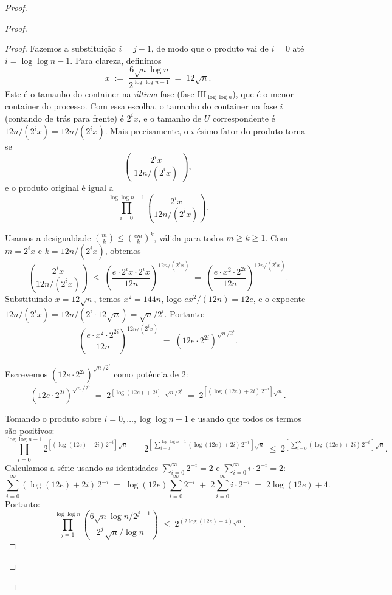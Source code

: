 \documentclass[reqno,a4paper,12pt]{amsart}
\begin{document}
\begin{proof}
\begin{proof}
    \begin{proof}
      Fazemos a substituição $i = j - 1$, de modo que o produto vai de $i = 0$ até
      $i = \log\log n - 1$. Para clareza, definimos
      \[
        x \;:=\; \frac{6\sqrt{n}\log n}{2^{\log\log n - 1}} \;=\; 12\sqrt{n}.
      \]
      Este é o tamanho do container na \emph{última} fase (fase $\mathrm{III}_{\log\log n}$), que é o
      menor container do processo. Com essa escolha, o tamanho do container na fase $i$ (contando de
      trás para frente) é $2^i x$, e o tamanho de $U$ correspondente é $12n / (2^i x) = 12n/(2^i x)$.
      Mais precisamente, o $i$-ésimo fator do produto torna-se
      \[
        \binom{2^i x}{\;12n/(2^i x)\;},
      \]
      e o produto original é igual a
      \[
        \prod_{i=0}^{\log\log n - 1} \binom{2^i x}{12n / (2^i x)}.
      \]

      Usamos a desigualdade $\binom{m}{k} \leq \left(\frac{em}{k}\right)^k$, válida para todos
      $m \geq k \geq 1$. Com $m = 2^i x$ e $k = 12n/(2^i x)$, obtemos
      \[
        \binom{2^i x}{12n/(2^i x)}
        \;\leq\;
        \left(\frac{e \cdot 2^i x \cdot 2^i x}{12n}\right)^{12n/(2^i x)}
        \;=\;
        \left(\frac{e \cdot x^2 \cdot 2^{2i}}{12n}\right)^{12n/(2^i x)}.
      \]
      Substituindo $x = 12\sqrt{n}$, temos $x^2 = 144n$, logo $ex^2/(12n) = 12e$, e o expoente
      $12n/(2^i x) = 12n / (2^i \cdot 12\sqrt{n}) = \sqrt{n}/2^i$. Portanto:
      \[
        \left(\frac{e \cdot x^2 \cdot 2^{2i}}{12n}\right)^{12n/(2^i x)}
        \;=\;
        \left(12e \cdot 2^{2i}\right)^{\sqrt{n}/2^i}.
      \]

      Escrevemos $(12e \cdot 2^{2i})^{\sqrt{n}/2^i}$ como potência de $2$:
      \[
        \left(12e \cdot 2^{2i}\right)^{\sqrt{n}/2^i}
        \;=\; 2^{\left[\log(12e) + 2i\right]\cdot \sqrt{n}/2^i}
        \;=\; 2^{\left[(\log(12e) + 2i)\,2^{-i}\right]\sqrt{n}}.
      \]

      Tomando o produto sobre $i = 0, \ldots, \log\log n - 1$ e usando que todos os termos são
      positivos:
      \[
        \prod_{i=0}^{\log\log n - 1}
        2^{\left[(\log(12e)+2i)\,2^{-i}\right]\sqrt{n}}
        \;=\;
        2^{\left[\,\sum_{i=0}^{\log\log n-1}(\log(12e)+2i)\,2^{-i}\,\right]\sqrt{n}}
        \;\leq\;
        2^{\left[\,\sum_{i=0}^{\infty}(\log(12e)+2i)\,2^{-i}\,\right]\sqrt{n}}.
      \]
      Calculamos a série usando as identidades $\sum_{i=0}^\infty 2^{-i} = 2$ e
      $\sum_{i=0}^\infty i \cdot 2^{-i} = 2$:
      \[
        \sum_{i=0}^{\infty} (\log(12e) + 2i)\,2^{-i}
        \;=\; \log(12e)\sum_{i=0}^\infty 2^{-i} \;+\; 2\sum_{i=0}^\infty i\cdot 2^{-i}
        \;=\; 2\log(12e) + 4.
      \]
      Portanto:
      \[
        \prod_{j=1}^{\log\log n}
        \binom{6\sqrt{n}\log n / 2^{j-1}}{2^j\,\sqrt{n}/\log n}
        \;\leq\; 2^{(2\log(12e)+4)\sqrt{n}}.
        \qquad
      \]
    \end{proof}


\end{proof}
\end{proof}
\end{document}
